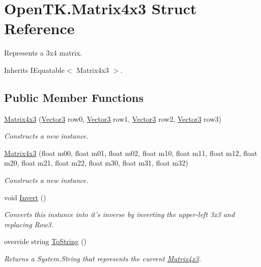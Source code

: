 \hypertarget{struct_open_t_k_1_1_matrix4x3}{\section{Open\-T\-K.\-Matrix4x3 Struct Reference}
\label{struct_open_t_k_1_1_matrix4x3}
}


Represents a 3x4 matrix.  




Inherits I\-Equatable$<$ Matrix4x3 $>$.

\subsection*{Public Member Functions}
\begin{DoxyCompactItemize}
\item 
\hyperlink{struct_open_t_k_1_1_matrix4x3_a182ed661372f386bb2be2548f028de5b}{Matrix4x3} (\hyperlink{struct_open_t_k_1_1_vector3}{Vector3} row0, \hyperlink{struct_open_t_k_1_1_vector3}{Vector3} row1, \hyperlink{struct_open_t_k_1_1_vector3}{Vector3} row2, \hyperlink{struct_open_t_k_1_1_vector3}{Vector3} row3)
\begin{DoxyCompactList}\small\item\em Constructs a new instance. \end{DoxyCompactList}\item 
\hyperlink{struct_open_t_k_1_1_matrix4x3_ab541a4105783b8bd1d8b16ea5ac5d541}{Matrix4x3} (float m00, float m01, float m02, float m10, float m11, float m12, float m20, float m21, float m22, float m30, float m31, float m32)
\begin{DoxyCompactList}\small\item\em Constructs a new instance. \end{DoxyCompactList}\item 
void \hyperlink{struct_open_t_k_1_1_matrix4x3_a79a75efdac1ae97c31f4dce5aaecdcdb}{Invert} ()
\begin{DoxyCompactList}\small\item\em Converts this instance into it's inverse by inverting the upper-\/left 3x3 and replacing Row3. \end{DoxyCompactList}\item 
override string \hyperlink{struct_open_t_k_1_1_matrix4x3_ab73d2c9fee438d3367ff410d03ebe0bf}{To\-String} ()
\begin{DoxyCompactList}\small\item\em Returns a System.\-String that represents the current \hyperlink{struct_open_t_k_1_1_matrix4x3}{Matrix4x3}. \end{DoxyCompactList}\item 

\end{DoxyCompactItemize}
